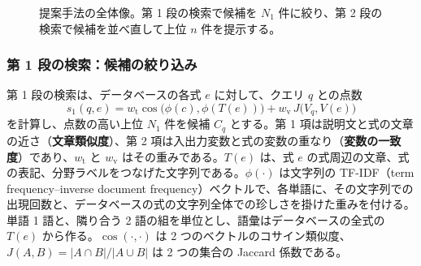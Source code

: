 \documentclass[11pt,a4paper]{ltjsarticle}
\newcommand{\Vin}{V_{\mathrm{in}}}
\newcommand{\Vout}{V_{\mathrm{out}}}
\begin{document}
\begin{figure}[t]\centering
{}
\caption{提案手法の全体像。第 1 段の検索で候補を $N_1$ 件に絞り、第 2 段の検索で候補を並べ直して上位 $n$ 件を提示する。}
\label{fig:overview}
\end{figure}

\subsubsection{第 1 段の検索：候補の絞り込み}\label{sec:stage1}
第 1 段の検索は、データベースの各式 $e$ に対して、クエリ $q$ との点数
\begin{equation}
  s_1(q, e) = w_{\mathrm{t}} \cos\bigl(\phi(c), \phi(T(e))\bigr) + w_{\mathrm{v}} \, J\bigl(V_q, V(e)\bigr)
  \label{eq:stage1}
\end{equation}
を計算し、点数の高い上位 $N_1$ 件を候補 $C_q$ とする。第 1 項は説明文と式の文章の近さ（\textbf{文章類似度}）、第 2 項は入出力変数と式の変数の重なり（\textbf{変数の一致度}）であり、$w_{\mathrm{t}}$ と $w_{\mathrm{v}}$ はその重みである。$T(e)$ は、式 $e$ の式周辺の文章、式の表記、分野ラベルをつなげた文字列である。$\phi(\cdot)$ は文字列の TF-IDF（term frequency--inverse document frequency）ベクトルで、各単語に、その文字列での出現回数と、データベースの式の文字列全体での珍しさを掛けた重みを付ける。単語 1 語と、隣り合う 2 語の組を単位とし、語彙はデータベースの全式の $T(e)$ から作る。$\cos(\cdot, \cdot)$ は 2 つのベクトルのコサイン類似度、$J(A, B) = |A \cap B| / |A \cup B|$ は 2 つの集合の Jaccard 係数である。
\end{document}
